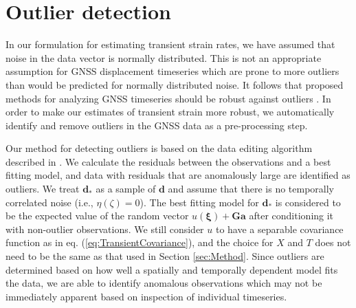 \documentclass[10pt,letter]{article}
\begin{document}
\section{Outlier detection}\label{sec:Outlier}
In our formulation for estimating transient strain rates, we have assumed that noise in the data vector is normally distributed. This is not an appropriate assumption for GNSS displacement timeseries which are prone to more outliers than would be predicted for normally distributed noise. It follows that proposed methods for analyzing GNSS timeseries should be robust against outliers \citep[e.g.,][]{Blewitt2016}. In order to make our estimates of transient strain more robust, we automatically identify and remove outliers in the GNSS data as a pre-processing step.

Our method for detecting outliers is based on the data editing algorithm described in \citet{Gibbs2011}. We calculate the residuals between the observations and a best fitting model, and data with residuals that are anomalously large are identified as outliers. We treat $\bm{d}_*$ as a sample of $\bm{d}$ and assume that there is no temporally correlated noise (i.e., $\eta(\zeta) = 0$).  The best fitting model for $\bm{d}_*$ is considered to be the expected value of the random vector $u(\bm{\xi}) + \bm{G}\bm{a}$ after conditioning it with non-outlier observations.  We still consider $u$ to have a separable covariance function as in eq. (\ref{eq:TransientCovariance}), and the choice for $X$ and $T$ does not need to be the same as that used in Section \ref{sec:Method}. Since outliers are determined based on how well a spatially and temporally dependent model fits the data, we are able to identify anomalous observations which may not be immediately apparent based on inspection of individual timeseries. 
\end{document}
